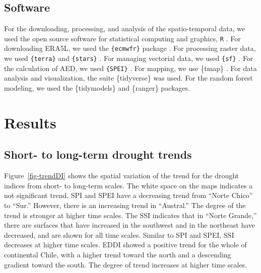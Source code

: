 \documentclass[
  authoryear,
  preprint,
  3p,
  onecolumn]{elsarticle}
\begin{document}
\hypertarget{software}{%
\subsection{Software}\label{software}}

For the downloading, processing, and analysis of the spatio-temporal
data, we used the open source software for statistical computing and
graphics, \texttt{R} \citep{R2023}. For downloading ERA5L, we used the
\texttt{\{ecmwfr\}} package \citep{Hufkens2019}. For processing raster
data, we used \texttt{\{terra\}} \citep{Hijmans2023} and
\texttt{\{stars\}} \citep{Pebesma2023}. For managing vectorial data, we
used \texttt{\{sf\}} \citep{Pebesma2018}. For the calculation of AED, we
used \texttt{\{SPEI\}} \citep{Bergueria2023}. For mapping, we use
\{tmap\} \citep{Tennekes2018}. For data analysis and visualization, the
suite \{tidyverse\} \citep{Wickham2019} was used. For the random forest
modeling, we used the \{tidymodels\}\citep{Kuhn2020} and
\{ranger\}\citep{Wright2017} packages.

\hypertarget{results}{%
\section{Results}\label{results}}

\hypertarget{short--to-long-term-drought-trends-1}{%
\subsection{Short- to long-term drought
trends}\label{short--to-long-term-drought-trends-1}}

Figure~\ref{fig-trendDI} shows the spatial variation of the trend for
the drought indices from short- to long-term scales. The white space on
the maps indicates a not significant trend. SPI and SPEI have a
decreasing trend from ``Norte Chico'' to ``Sur.'' However, there is an
increasing trend in ``Austral.'' The degree of the trend is stronger at
higher time scales. The SSI indicates that in ``Norte Grande,'' there
are surfaces that have increased in the southwest and in the northeast
have decreased, and are shown for all time scales. Similar to SPI and
SPEI, SSI decreases at higher time scales. EDDI showed a positive trend
for the whole of continental Chile, with a higher trend toward the north
and a descending gradient toward the south. The degree of trend
increases at higher time scales.

\blandscape
\end{document}
